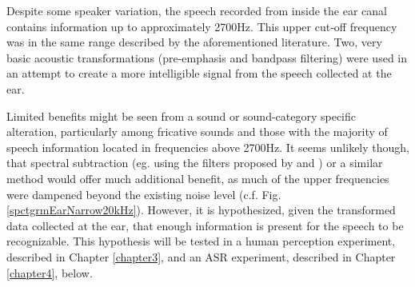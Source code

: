 Despite some speaker variation, the speech recorded from inside the ear canal contains information up to approximately 2700Hz.  This upper cut-off frequency was in the same range described by the aforementioned literature.  Two, very basic acoustic transformations (pre-emphasis and bandpass filtering) were used in an attempt to create a more intelligible signal from the speech collected at the ear.

Limited benefits might be seen from a sound or sound-category specific alteration, particularly among fricative sounds and those with the majority of speech information located in frequencies above 2700Hz.  It seems unlikely though, that spectral subtraction (eg. using the filters proposed by \cite{hansen:97b} and \cite{reinfeldt:10}) or a similar method would offer much additional benefit, as much of the upper frequencies were dampened beyond the existing noise level (c.f. Fig. \ref{spctgrmEarNarrow20kHz}).  However, it is hypothesized, given the transformed data collected at the ear, that enough information is present for the speech to be recognizable.  This hypothesis will be tested in a human perception experiment, described in Chapter \ref{chapter3}, and an ASR experiment, described in Chapter \ref{chapter4}, below.







